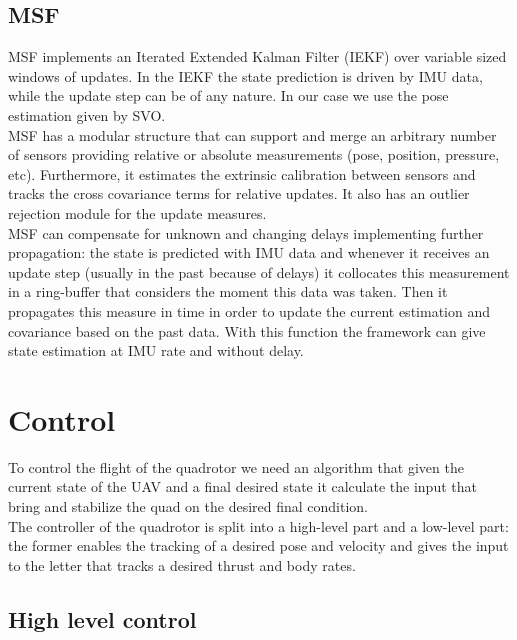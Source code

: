 

\subsection{MSF}
MSF implements an Iterated Extended Kalman Filter (IEKF) \cite{bell1993iterated} over variable sized windows of updates. In the IEKF  the state prediction is driven by IMU data, while the update step can be of any nature. In our case we use the pose estimation given by SVO.\\
MSF has a modular structure that can support and merge an arbitrary number of sensors providing relative or absolute measurements (pose, position, pressure, etc). Furthermore, it estimates the extrinsic calibration between sensors and tracks the cross covariance terms for relative updates. It also has an outlier rejection module for the update measures.\\
MSF can compensate for unknown and changing delays implementing further propagation: the state is predicted with IMU data and whenever it receives an update step (usually in the past because of delays) it collocates this measurement in a ring-buffer that considers the moment this data was taken. Then it propagates this measure in time in order to update the current estimation and covariance based on the past data. With this function the framework can give state estimation at IMU rate and without delay.


\section{Control}
To control the flight of the quadrotor we need an algorithm that given the current state of the UAV and a final desired state it calculate the input that bring and stabilize the quad on the desired final condition.\\
The controller of the quadrotor is split into a high-level part and a low-level part: the former enables the tracking of a desired  pose and velocity and gives the input to the letter that tracks a desired thrust and body rates.\\

\subsection{High level control}\label{sec:high_control}

